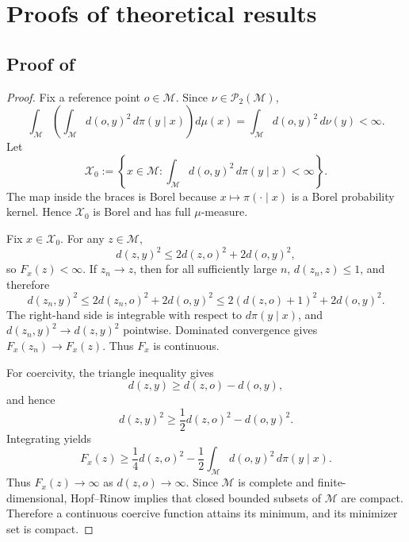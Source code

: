 \documentclass[10pt]{article} %
\theoremstyle{definition}
\providecommand{\1}{\mathbf{1}}
\providecommand{\sM}{\mathcal{M}}
\providecommand{\sX}{\mathcal{X}}
\begin{document}







\appendix
\section{Proofs of theoretical results}
\subsection{Proof of }
\begin{proof}
Fix a reference point $o\in\sM$. Since $\nu\in\mathcal P_2(\sM)$,
\[
\int_{\sM}\left(\int_{\sM} d(o,y)^2\,d\pi(y\mid x)\right)d\mu(x)
=
\int_{\sM} d(o,y)^2\,d\nu(y)<\infty.
\]
Let
\[
\sX_0:=\left\{x\in\sM:\int_{\sM} d(o,y)^2\,d\pi(y\mid x)<\infty\right\}.
\]
The map inside the braces is Borel because $x\mapsto\pi(\cdot\mid x)$ is a Borel probability kernel. Hence $\sX_0$ is Borel and has full $\mu$-measure.

Fix $x\in \sX_0$. For any $z\in\sM$,
\[
d(z,y)^2\le 2d(z,o)^2+2d(o,y)^2,
\]
so $F_x(z)<\infty$. If $z_n\to z$, then for all sufficiently large $n$, $d(z_n,z)\le 1$, and therefore
\[
d(z_n,y)^2
\le 2d(z_n,o)^2+2d(o,y)^2
\le 2(d(z,o)+1)^2+2d(o,y)^2.
\]
The right-hand side is integrable with respect to $d\pi(y\mid x)$, and $d(z_n,y)^2\to d(z,y)^2$ pointwise. Dominated convergence gives $F_x(z_n)\to F_x(z)$. Thus $F_x$ is continuous.

For coercivity, the triangle inequality gives
\[
d(z,y)\ge d(z,o)-d(o,y),
\]
and hence
\[
d(z,y)^2\ge \frac12 d(z,o)^2-d(o,y)^2.
\]
Integrating yields
\[
F_x(z)\ge \frac14 d(z,o)^2-\frac12\int_{\sM} d(o,y)^2\,d\pi(y\mid x).
\]
Thus $F_x(z)\to\infty$ as $d(z,o)\to\infty$. Since $\sM$ is complete and finite-dimensional, Hopf--Rinow implies that closed bounded subsets of $\sM$ are compact. Therefore a continuous coercive function attains its minimum, and its minimizer set is compact.
\end{proof}
\end{document}
